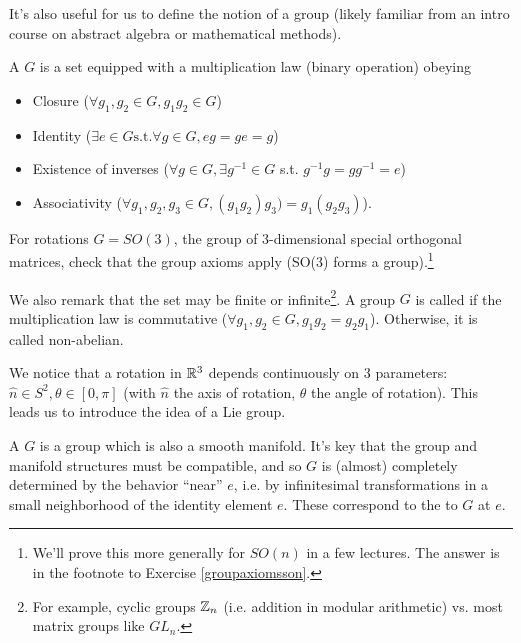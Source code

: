 It's also useful for us to define the notion of a group (likely familiar from an intro course on abstract algebra or mathematical methods).

\begin{defn}
A  $G$ is a set equipped with a multiplication law (binary operation) obeying
\begin{itemize}
    \item Closure ($\forall g_1, g_2\in G, g_1g_2 \in G$)
    \item Identity ($\exists e\in G \text{s.t.} \forall g\in G, eg = ge = g$)
    \item Existence of inverses ($\forall g \in G, \exists g^{-1} \in G$ s.t. $g^{-1}g=gg^{-1}=e$)
    \item Associativity ($\forall g_1,g_2,g_3\in G, (g_1g_2)g_3)=g_1(g_2g_3)$).
\end{itemize}
\end{defn}
\begin{ex}
 For rotations $G=SO(3)$, the group of 3-dimensional special orthogonal matrices, check that the group axioms apply (SO(3) forms a group).\footnote{We'll prove this more generally for $SO(n)$ in a few lectures. The answer is in the footnote to Exercise \ref{groupaxiomsson}.}
\end{ex}

We also remark that the set may be finite or infinite\footnote{For example, cyclic groups $\mathbb{Z}_n$ (i.e. addition in modular arithmetic) vs. most matrix groups like $GL_n$.}. A group $G$ is called  if the multiplication law is commutative ($\forall g_1,g_2\in G, g_1g_2=g_2g_1$). Otherwise, it is called non-abelian.

We notice that a rotation in $\mathbb{R}^3$ depends continuously on 3 parameters: $\hat n\in S^2, \theta \in[0,\pi]$ (with $\hat n$ the axis of rotation, $\theta$ the angle of rotation). This leads us to introduce the idea of a Lie group.
\begin{defn}
A  $G$ is a group which is also a smooth manifold. It's key that the group and manifold structures must be compatible, and so $G$ is (almost) completely determined by the behavior ``near'' $e$, i.e. by infinitesimal transformations in a small neighborhood of the identity element $e$. These correspond to the  to $G$ at $e$.
\end{defn}

